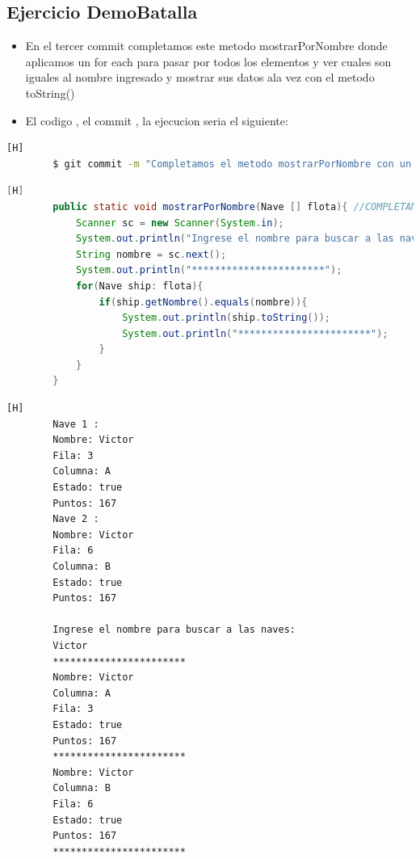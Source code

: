 \documentclass{article}
\begin{document}
	\subsection{Ejercicio DemoBatalla}
	\begin{itemize}	
		\item En el tercer commit completamos este metodo mostrarPorNombre donde aplicamos un for each para pasar por todos los elementos y ver cuales son iguales al nombre ingresado y mostrar sus datos ala vez con el metodo toString()
		\item El codigo , el commit , la ejecucion seria el siguiente:
	\end{itemize}
	\begin{lstlisting}[language=bash,caption={Commit}][H]
		$ git commit -m "Completamos el metodo mostrarPorNombre con un for each este nos permite comparar el nombre con cada elemento del array y en caso de ser iguales imprimira sus datos"
	\end{lstlisting}
	\begin{lstlisting}[language=java,caption={Las lineas de codigo del metodo completado:}][H]
        public static void mostrarPorNombre(Nave [] flota){ //COMPLETAMOS EL METODO mostrarPorNombre Y NOS AYUDAMOS DE UN FOR EACH CON TAL QUE SI EL NOMBRE INGRESADO ERA IGUAL AL OBJETO CREADO MOSTRABA LOS DATOS DEL OBJETO Y TAMBIEN USAMOS EL METODO toString()
            Scanner sc = new Scanner(System.in);
            System.out.println("Ingrese el nombre para buscar a las naves: ");
            String nombre = sc.next();
            System.out.println("***********************");
            for(Nave ship: flota){
                if(ship.getNombre().equals(nombre)){
                    System.out.println(ship.toString());
                    System.out.println("***********************");
                }
            }
        }
	\end{lstlisting}
    \begin{lstlisting}[language=bash,caption={La ejecucion dada:}][H]
        Nave 1 : 
        Nombre: Victor
        Fila: 3
        Columna: A
        Estado: true
        Puntos: 167
        Nave 2 : 
        Nombre: Victor
        Fila: 6
        Columna: B
        Estado: true
        Puntos: 167
            
        Ingrese el nombre para buscar a las naves: 
        Victor
        ***********************
        Nombre: Victor
        Columna: A
        Fila: 3
        Estado: true
        Puntos: 167
        ***********************
        Nombre: Victor
        Columna: B
        Fila: 6
        Estado: true
        Puntos: 167
        ***********************

    \end{lstlisting}
\end{document}
